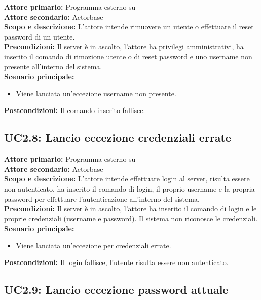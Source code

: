 \documentclass{scalatekids-article}
\begin{document}
\textbf{Attore primario:} Programma esterno su \\
\textbf{Attore secondario:} Actorbase\\
\textbf{Scopo e descrizione:}
L'attore intende rimuovere un utente o effettuare il reset password di un utente.\\
\textbf{Precondizioni:} Il server è in ascolto, l'attore ha privilegi amministrativi, ha inserito il comando di rimozione utente o di reset password e uno username non presente all'interno del sistema.\\
\textbf{Scenario principale:}
\begin{itemize}
\item Viene lanciata un'eccezione username non presente.
\end{itemize}
\textbf{Postcondizioni:} Il comando inserito fallisce.

\subsection{UC2.8: Lancio eccezione credenziali errate}

\textbf{Attore primario:} Programma esterno su \\
\textbf{Attore secondario:} Actorbase\\
\textbf{Scopo e descrizione:}
L'attore intende effettuare login al server, risulta essere non autenticato, ha inserito il comando di login, il proprio username e la propria password per effettuare l'autenticazione all'interno del sistema.\\
\textbf{Precondizioni:} Il server è in ascolto, l'attore ha inserito il comando di login e le proprie credenziali (username e password). Il sistema non riconosce le credenziali.\\
\textbf{Scenario principale:}
\begin{itemize}
\item Viene lanciata un'eccezione per credenziali errate.
\end{itemize}
\textbf{Postcondizioni:} Il login fallisce, l'utente risulta essere non autenticato.

\subsection{UC2.9: Lancio eccezione password attuale}
\end{document}
